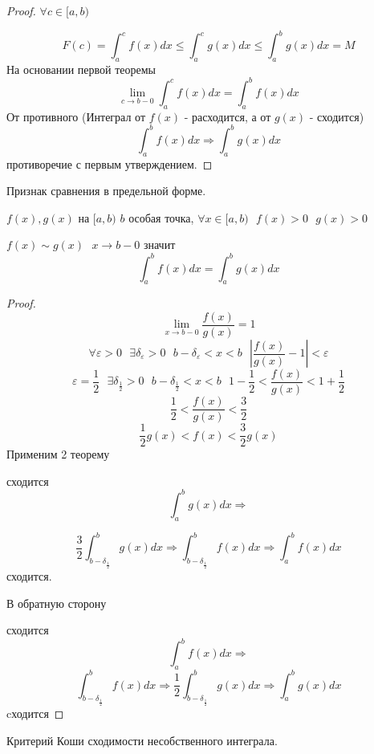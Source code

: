 \begin{proof}
  $\forall c \in [a, b)$

  \[
    F(c) = \int^{c}_{a} f(x)dx \le \int^{c}_{a} g(x)dx \le
    \int^{b}_{a} g(x)dx = M
  \]
  На основании первой теоремы
  \[
    \lim_{c \to b - 0} \int^{c}_{a} f(x)dx = \int^{b}_{a} f(x)dx
  \]
   От противного (Интеграл от $f(x)$ - расходится, а от $g(x)$ -
  сходится)
  \[
    \int^{b}_{a} f(x)dx \Rightarrow \int^{b}_{a} g(x)dx
  \]
  противоречие с первым утверждением.
\end{proof}

\begin{title}[\Large]
  Признак сравнения в предельной форме.
\end{title}

\begin{theorem}
  $f(x), g(x)$ на $[a, b)$ $b$ особая точка, $\forall x \in [a,b) ~~~
  f(x) > 0 ~~~ g(x) > 0$

  $f(x) \sim g(x) ~~~ x \to b -0$ значит
  $$
  \int_a^b f(x)dx = \int_a^b g(x)dx
  $$
\end{theorem}

\begin{proof}
  $$
  \lim_{x \to b-0} \frac{f(x)}{g(x)} = 1
  $$
  $$
  \forall \varepsilon > 0 ~~~ \exists \delta_{\varepsilon} > 0 ~~~
  b - \delta_{\varepsilon} < x < b ~~~ \left| \frac{f(x)}{g(x)} - 1 \right|
  < \varepsilon
  $$
  $$
  \varepsilon = \frac{1}{2} ~~~ \exists \delta_{\frac{1}{2}} > 0 ~~~
  b - \delta_{\frac{1}{2}} < x < b ~~~
  1 - \frac{1}{2} < \frac{f(x)}{g(x)} < 1 + \frac{1}{2}
  $$
  $$
  \frac{1}{2} < \frac{f(x)}{g(x)} < \frac{3}{2}
  $$
  $$
  \frac{1}{2} g(x) < f(x) < \frac{3}{2} g(x)
  $$
  Применим 2 теорему

  сходится
  $$
  \int_a^b g(x)dx \Rightarrow
  $$

  $$
  \frac{3}{2} \int_{b - \delta_{\frac{1}{2}}}^b g(x)dx \Rightarrow
  \int_{b - \delta_{\frac{1}{2}}}^b f(x)dx \Rightarrow
  \int_a^b f(x)dx
  $$
  сходится.

  В обратную сторону

  сходится
  $$
  \int_a^b f(x)dx \Rightarrow
  $$
  $$
  \int_{b - \delta_{\frac{1}{2}}}^b f(x)dx \Rightarrow
  \frac{1}{2} \int_{b - \delta_{\frac{1}{2}}}^b g(x)dx \Rightarrow
  \int_a^b g(x)dx
  $$
  cходится
\end{proof}

\begin{title}[\Large]
  Критерий Коши сходимости несобственного интеграла.
\end{title}

